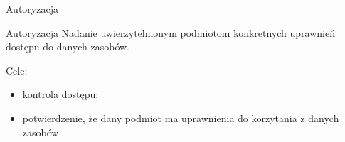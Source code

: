 \begin{frame}{Autoryzacja}
	
	\begin{alertblock}{Autoryzacja}
		Nadanie uwierzytelnionym podmiotom konkretnych uprawnień dostępu do danych zasobów.
	\end{alertblock}
	
	Cele:
	\begin{itemize}
		\item kontrola dostępu;
		\item potwierdzenie, że dany podmiot ma uprawnienia do korzytania z danych zasobów.
	\end{itemize}
	
\end{frame}
